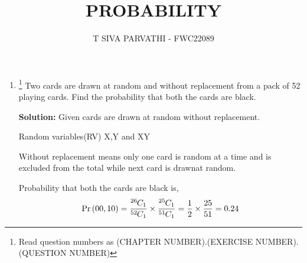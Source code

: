 \documentclass{article}
\newcommand{\solution}{\noindent \textbf{Solution: }}
\providecommand{\pr}[1]{\ensuremath{\Pr\left(#1\right)}}
\newcommand*{\permcomb}[4][0mu]{{{}^{#3}\mkern#1#2_{#4}}}
\newcommand*{\comb}[1][-1mu]{\permcomb[#1]{C}}
\begin{document}
\title{PROBABILITY}
\author{\Large T SIVA PARVATHI - FWC22089}
\date{}

\maketitle

\begin{enumerate}[label=13.\arabic{enumi}.\arabic{enumii}]%
\setcounter{enumi}{1}
\setcounter{enumii}{2}

\item \footnote{Read question numbers as (CHAPTER NUMBER).(EXERCISE NUMBER).(QUESTION NUMBER)} 
Two cards are drawn at random and without replacement from a pack of 52 playing cards. Find the probability that both the cards are black.

	\solution
	Given cards are drawn at random without replacement.
\begin{table}[h]\centering
	
	\caption{Random variables(RV) X,Y and XY}\label{table1:}
\end{table}

Without replacement means only one card is random at a time and is excluded from the total while next card is drawnat random.

Probability that both the cards are black is,
\begin{align}
\pr{00,10} =\frac{\comb{26}{1}}{\comb{52}{1}} \times \frac{\comb{25}{1}}{\comb{51}{1}} = \frac{1}{2} \times \frac{25}{51} = 0.24
\end{align}
\end{enumerate}
\end{document}
